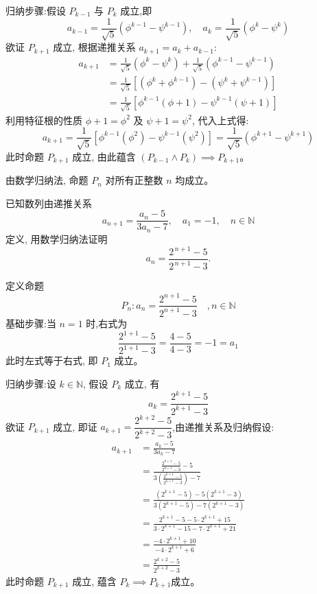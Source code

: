 \begin{questions}
\begin{solution}
        归纳步骤:假设 $P_{k-1}$ 与 $P_k$ 成立,即
        \[
        a_{k-1} = \frac{1}{\sqrt{5}}(\phi^{k-1} - \psi^{k-1}), \quad a_k = \frac{1}{\sqrt{5}}(\phi^k - \psi^k)
        \]
        欲证 $P_{k+1}$ 成立, 根据递推关系 $a_{k+1} = a_k + a_{k-1}$:
        \begin{align}
        a_{k+1} &= \frac{1}{\sqrt{5}}(\phi^k - \psi^k) + \frac{1}{\sqrt{5}}(\phi^{k-1} - \psi^{k-1}) \\
        &= \frac{1}{\sqrt{5}} \left[ (\phi^k + \phi^{k-1}) - (\psi^k + \psi^{k-1}) \right] \\
        &= \frac{1}{\sqrt{5}} \left[ \phi^{k-1}(\phi + 1) - \psi^{k-1}(\psi + 1) \right]
        \end{align}
        利用特征根的性质 $\phi + 1 = \phi^2$ 及 $\psi + 1 = \psi^2$, 代入上式得:
        \[
        a_{k+1} = \frac{1}{\sqrt{5}} \left[ \phi^{k-1}(\phi^2) - \psi^{k-1}(\psi^2) \right] 
        = \frac{1}{\sqrt{5}} (\phi^{k+1} - \psi^{k+1})
        \]
        此时命题 $P_{k+1}$ 成立, 由此蕴含 $(P_{k-1} \land P_k) \implies P_{k+1}$。

        由数学归纳法, 命题 $P_n$ 对所有正整数 $n$ 均成立。
    \end{solution}

    \question 已知数列由递推关系
    \[
    a_{n+1}=\frac{a_n-5}{3a_n-7},\quad a_1=-1,\quad n\in\mathbb{N}
    \]
    定义, 用数学归纳法证明
    \[
    a_n=\frac{2^{\,n+1}-5}{2^{\,n+1}-3}.
    \]
    \begin{solution}
        定义命题 
        \[
        P_n:a_n = \frac{2^{n+1}-5}{2^{n+1}-3} \quad, n \in \mathbb{N}
        \]
        基础步骤:当 $n=1$ 时,右式为 
        \[
        \frac{2^{1+1}-5}{2^{1+1}-3} = \frac{4-5}{4-3} = -1=a_1
        \]
        此时左式等于右式, 即 $P_1$ 成立。

        归纳步骤:设 $k \in \mathbb{N}$, 假设 $P_k$ 成立, 有
        \[
        a_k = \frac{2^{k+1}-5}{2^{k+1}-3}
        \]
        欲证 $P_{k+1}$ 成立, 即证 $a_{k+1} = \dfrac{2^{k+2}-5}{2^{k+2}-3}$,由递推关系及归纳假设:
        \begin{align}
        a_{k+1} &= \frac{a_k - 5}{3a_k - 7} \\
        &= \frac{\frac{2^{k+1}-5}{2^{k+1}-3} - 5}{3\left(\frac{2^{k+1}-5}{2^{k+1}-3}\right) - 7} \\
        &= \frac{(2^{k+1}-5) - 5(2^{k+1}-3)}{3(2^{k+1}-5) - 7(2^{k+1}-3)} \\
        &= \frac{2^{k+1} - 5 - 5 \cdot 2^{k+1} + 15}{3 \cdot 2^{k+1} - 15 - 7 \cdot 2^{k+1} + 21} \\
        &= \frac{-4 \cdot 2^{k+1} + 10}{-4 \cdot 2^{k+1} + 6}\\
        &= \frac{2^{k+2} - 5}{2^{k+2} - 3}
        \end{align}
        此时命题 $P_{k+1}$ 成立, 蕴含 $P_k \implies P_{k+1}$成立。


\end{solution}
\end{questions}
